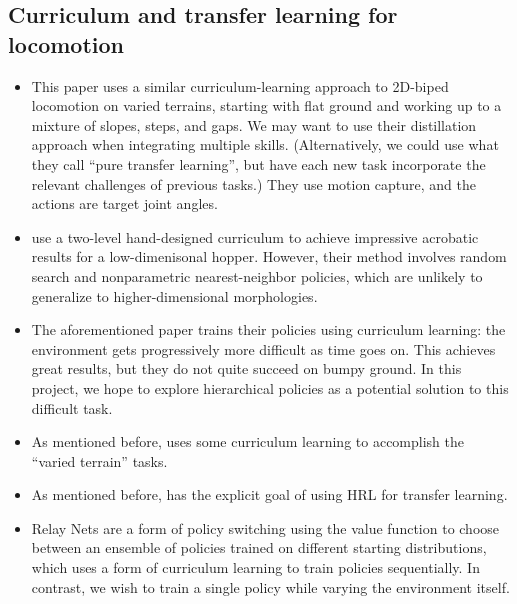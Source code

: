 \documentclass[a4paper]{article}
\begin{document}
\subsection*{Curriculum and transfer learning for locomotion}

\begin{itemize}
  \item \cite{2018-ICLR-distill} This paper uses a similar curriculum-learning approach to 2D-biped locomotion on varied terrains, starting with flat ground and working up to a mixture of slopes, steps, and gaps. We may want to use their distillation approach when integrating multiple skills. (Alternatively, we could use what they call ``pure transfer learning'', but have each new task incorporate the relevant challenges of previous tasks.) They use motion capture, and the actions are target joint angles.

  \item \cite{karpathy2012curriculum} use a two-level hand-designed curriculum to achieve impressive acrobatic results for a low-dimenisonal hopper.
    However, their method involves random search and nonparametric nearest-neighbor policies, which are unlikely to generalize to higher-dimensional morphologies.

  \item The aforementioned paper \cite{heess2017emergence} trains their policies using curriculum learning: the environment gets progressively more difficult as time goes on.
    This achieves great results, but they do not quite succeed on bumpy ground.
    In this project, we hope to explore hierarchical policies as a potential solution to this difficult task.

  \item As mentioned before, \cite{peng2018deepmimic} uses some curriculum learning to accomplish the ``varied terrain'' tasks.

  \item As mentioned before, \cite{frans2018meta} has the explicit goal of using HRL for transfer learning.

  \item Relay Nets \citep{kumar2017relay} are a form of policy switching using the value function to choose between an ensemble of policies trained on different starting distributions, which uses a form of curriculum learning to train policies sequentially.
    In contrast, we wish to train a single policy while varying the environment itself.

\end{itemize}
\end{document}
